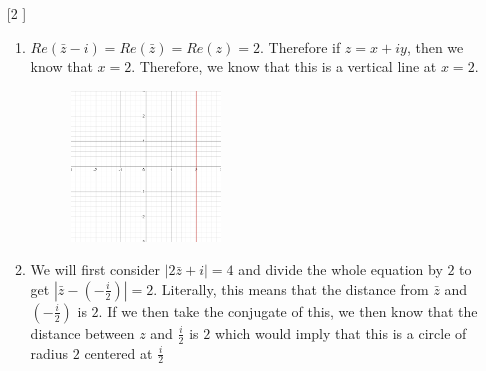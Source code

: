 \documentclass{article}
\theoremstyle{definition}
\newcommand{\C}{\mathbb{C}}
\begin{document}
\begin{enumerate}
    \begin{proof}
    Let $z_1, z_2 \in \C$ such that $z_1 = x_1 + iy_1$ and $z_2 = x_2 + iy_2$. Then we have that $z_1z_2 = (x_1x_2 - y_1y_2) + i(y_1x_2 + y_2x_1)$. Then it would follow that $|z_1z_2| = \sqrt{(x_1x_2 - y_1y_2)^2 + (y_1x_2 + y_2x_1)^2} = \sqrt{(x_1x_2)^2 - 2(x_1x_2y_1y_2) + (y_1y_2)^2 + (y_1x_2)^2 + (x_1y_2)^2 + 2(x_1x_2y_1y_2)} = \sqrt{(x_1x_2)^2 + (y_1y_2)^2 + (y_1x_2)^2 + (x_1y_2)^2} = \sqrt{x_1^2x_2^2 + y_1^2y_2^2 + y_1^2x_2^2 + x_1^2y_2^2} = \sqrt{(x_1^2 + y_1^2)(x_2^2+y_2^2)}$ as desired. It would then follow that $\sqrt{(x_1^2 + y_1^2)(x_2^2+y_2^2)} = \sqrt{(x_1^2 + y_1^2)}\sqrt{(x_2^2+y_2^2)} = |z_1||z_2|$ proving the identity.
    \end{proof}
    
    \item [[\phantom{-}2]]
    
    \begin{enumerate}
        \item 
        
        $Re(\bar{z} - i) = Re(\bar{z}) = Re(z) = 2$. Therefore if $z = x + iy$, then we know that $x = 2$. Therefore, we know that this is a vertical line at $x = 2.$
        
        \begin{figure}[h]
            \centering
            \includegraphics[width=0.4\textwidth]{figure_a.png}
        \end{figure} 
        
        \item
        
        We will first consider $|2\bar{z} + i| = 4$ and divide the whole equation by $2$ to get $|\bar{z} - (-\frac{i}{2})| = 2$. Literally, this means that the distance from $\bar{z}$ and $(-\frac{i}{2})$ is $2.$ If we then take the conjugate of this, we then know that the distance between $z$ and $\frac{i}{2}$ is $2$ which would imply that this is a circle of radius $2$ centered at $\frac{i}{2}$
        \\\\\\\\\\\\\\\\\\\\\\
        

\end{enumerate}
\end{enumerate}
\end{document}
